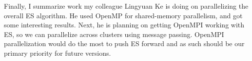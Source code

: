 Finally, I summarize work my colleague Lingyuan Ke is doing on parallelizing the overall ES algorithm.
He used OpenMP for shared-memory parallelism, and got some interesting results.
Next, he is planning on getting OpenMPI working with ES, so we can parallelize across clusters using message passing.
OpenMPI parallelization would do the most to push ES forward and as such should be our primary priority for future versions.

